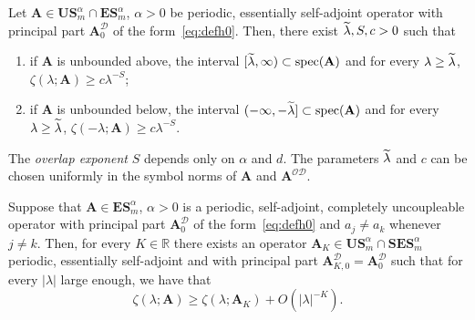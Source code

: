 \documentclass[AHL,Unicode,longabstracts,published]{cedram}
\DeclareMathOperator{\spec}{spec}
\newcommand{\R}{\mathbb R}
\newcommand{\CD}{\mathcal{D}}
\newcommand{\CO}{\mathcal{O}}
\newcommand{\BA}{\mathbf A}
\newcommand{\BE}{\mathbf E}
\newcommand{\BS}{\mathbf S}
\newcommand{\BU}{\mathbf U}
\newcommand{\bigo}[1]{O\left(#1 \right)}
\newcommand{\abs}[1]{\left\lvert #1 \right\rvert}
\let\oldtilde\tilde
\renewcommand*{\tilde}[1]{\mathchoice{\widetilde{#1}}{\widetilde{#1}}{\oldtilde{#1}}{\oldtilde{#1}}}
\begin{document}
\begin{coro}\label{cor:uncoupledbs}
Let $\BA \in \BU\BS^\alpha_m \cap \BE\BS_m^\alpha$, $\alpha > 0$ be periodic, essentially self-adjoint operator with principal part $\BA_0^\CD$ of the form~\eqref{eq:defh0}. Then, there exist $\tilde \lambda, S,c > 0$ such that
\begin{enumerate}
\item \label{it:bsposuc}
if $\BA$ is unbounded above, the interval $[\tilde \lambda,\infty) \subset
\spec(\BA)$ and for every $\lambda \ge \tilde \lambda$, $\zeta(\lambda;\BA) \ge c
\lambda^{-S}$;
\item \label{it:bsneguc}
if $\BA$ is unbounded below, the interval $(- \infty,-\tilde \lambda] \subset
\spec(\BA)$ and for every $\lambda \ge \tilde \lambda$, $\zeta(-\lambda;\BA) \ge c
\lambda^{-S}$.
\end{enumerate}
The \emph{overlap exponent} $S$ depends only on $\alpha$ and $d$. The parameters $\tilde \lambda$ and $c$ can be chosen uniformly in the symbol norms of $\BA$ and $\BA^{\CO\CD}$.
\end{coro}



\begin{lemm}\label{lem:uncoupledlower}
Suppose that $\BA \in \BE\BS^\alpha_m$, $\alpha > 0$ is a periodic, self-adjoint, completely uncoupleable operator with principal part $\BA_0^\CD$ of the form~\eqref{eq:defh0} and $a_j \ne a_k$ whenever $j \ne k$. Then, for every $K
\in \R$ there exists an operator $\BA_K \in \BU\BS_m^\alpha \cap
\BS\BE\BS_m^\alpha$ periodic, essentially self-adjoint and with principal part $\BA_{K,0}^\CD = \BA_0^\CD$ such that for every $\abs \lambda$ large enough, we have that
\begin{equation}\label{eq:bsequiv}
\zeta(\lambda;\BA)
\ge
\zeta(\lambda;\BA_K) + \bigo{\abs{\lambda}^{-K}}.
\end{equation}
\end{lemm}
\end{document}
